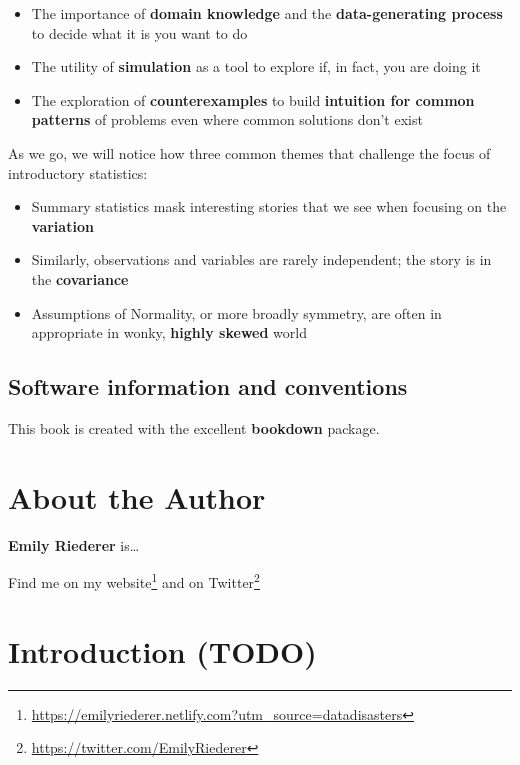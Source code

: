 \documentclass[
]{krantz}
\providecommand{\tightlist}{%
  \setlength{\itemsep}{0pt}\setlength{\parskip}{0pt}}
\renewcommand{\href}[2]{#2\footnote{\url{#1}}}
\begin{document}
\begin{itemize}
\tightlist
\item
  The importance of \textbf{domain knowledge} and the \textbf{data-generating process} to decide what it is you want to do
\item
  The utility of \textbf{simulation} as a tool to explore if, in fact, you are doing it
\item
  The exploration of \textbf{counterexamples} to build \textbf{intuition for common patterns} of problems even where common solutions don't exist
\end{itemize}

As we go, we will notice how three common themes that challenge the focus of introductory statistics:

\begin{itemize}
\tightlist
\item
  Summary statistics mask interesting stories that we see when focusing on the \textbf{variation}
\item
  Similarly, observations and variables are rarely independent; the story is in the \textbf{covariance}
\item
  Assumptions of Normality, or more broadly symmetry, are often in appropriate in wonky, \textbf{highly skewed} world
\end{itemize}

\hypertarget{software-information-and-conventions}{%
\section*{Software information and conventions}\label{software-information-and-conventions}}


This book is created with the excellent \textbf{bookdown} package.

\hypertarget{about-the-author}{%
\chapter*{About the Author}\label{about-the-author}}


\textbf{Emily Riederer} is\ldots{}

Find me on my \href{https://emilyriederer.netlify.com?utm_source=datadisasters}{website} and on \href{https://twitter.com/EmilyRiederer}{Twitter}

\mainmatter

\hypertarget{introduction-todo}{%
\chapter{Introduction (TODO)}\label{introduction-todo}}
\end{document}
